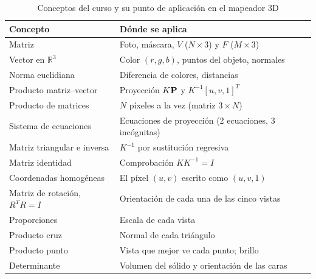 \begin{table}[htbp]
\caption{Conceptos del curso y su punto de aplicación en el mapeador 3D}
\label{tab:mapeo-conceptos}
\begin{tabular}{ll}
\toprule
Concepto & Dónde se aplica \\
\midrule
Matriz & Foto, máscara, $V$ ($N\times3$) y $F$ ($M\times3$) \\
Vector en $\mathbb{R}^3$ & Color $(r,g,b)$, puntos del objeto, normales \\
Norma euclidiana & Diferencia de colores, distancias \\
Producto matriz--vector & Proyección $K\mathbf{P}$ y $K^{-1}[u,v,1]^T$ \\
Producto de matrices & $N$ píxeles a la vez (matriz $3\times N$) \\
Sistema de ecuaciones & Ecuaciones de proyección (2 ecuaciones, 3 incógnitas) \\
Matriz triangular e inversa & $K^{-1}$ por sustitución regresiva \\
Matriz identidad & Comprobación $KK^{-1}=I$ \\
Coordenadas homogéneas & El píxel $(u,v)$ escrito como $(u,v,1)$ \\
Matriz de rotación, $R^TR=I$ & Orientación de cada una de las cinco vistas \\
Proporciones & Escala de cada vista \\
Producto cruz & Normal de cada triángulo \\
Producto punto & Vista que mejor ve cada punto; brillo \\
Determinante & Volumen del sólido y orientación de las caras \\
\bottomrule
\end{tabular}
\end{table}
